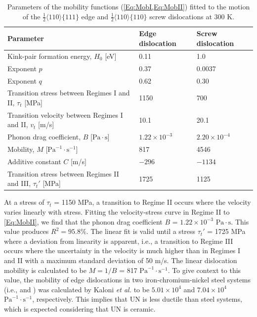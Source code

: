 \documentclass[applsci,article,submit,pdftex,moreauthors]{Definitions/mdpi}
\newcommand{\?}{\stackrel{?}{=}}
\begin{document}
\begin{table}[h!]
\centering
\caption{Parameters of the mobility functions (\cref{Eq:MobI,Eq:MobII}) fitted to the motion of the $\frac{1}{2}\langle110\rangle\{111\}$ edge and $\frac{1}{2}\langle110\rangle\{110\}$ screw dislocations at 300 K.}
\footnotesize
\begin{tabular}{lll}
\hline
Parameter & Edge dislocation & Screw dislocation \\
\hline
Kink-pair formation energy, $H_0$ [eV] & 0.11 & 1.0 \\
Exponent $p$ & 0.37 & 0.0037 \\
Exponent $q$ & 0.62 & 0.30 \\
Transition stress between Regimes I and II, $\tau_t$ [MPa] & 1150 & 700 \\
Transition velocity between Regimes I and II, $v_t$ [m/s] & 10.1 & 20.1 \\
Phonon drag coefficient, $B$ [$\mathrm{Pa} \! \cdot \! \mathrm{s}$] & $1.22 \times 10^{-3}$ & $2.20 \times 10^{-4}$ \\ 
Mobility, $M$ [$\mathrm{Pa}^{-1} \! \cdot \! \mathrm{s}^{-1}$] & 817 & 4546 \\
Additive constant $C$ [m/s] & $-296$ & $-1134$ \\
Transition stress between Regimes II and III, $\tau_t'$ [MPa] & 1725 & 1125 \\
\hline
\end{tabular}
\label{Tab:DislocParams}
\end{table}

At a stress of $\tau_t$ = 1150 MPa, a transition to Regime II occurs where the velocity varies linearly with stress. Fitting the velocity-stress curve in Regime II to \cref{Eq:MobII}, we find that the phonon drag coefficient $B$ = $1.22 \times 10^{-3}$ $\mathrm{Pa} \! \cdot \! \mathrm{s}$. This value produces $R^2 = 95.8\%$. The linear fit is valid until a stress $\tau_t'$ = 1725 MPa where a deviation from linearity is apparent, i.e., a transition to Regime III occurs where the uncertainty in the velocity is much higher than in Regimes I and II with a maximum standard deviation of 50 m/s. The linear dislocation mobility is calculated to be $M = 1/B$ = 817 $\mathrm{Pa}^{-1} \! \cdot \! \mathrm{s}^{-1}$. To give context to this value, the mobility of edge dislocations in two iron-chromium-nickel steel systems (i.e.,  and ) was calculated by Kaloni \textit{et al.} \cite{Kaloni2023} to be $5.01 \times 10^4$ and $7.04 \times 10^4$ $\mathrm{Pa}^{-1} \! \cdot \! \mathrm{s}^{-1}$, respectively. This implies that UN is less ductile than steel systems, which is expected considering that UN is ceramic.
\end{document}
